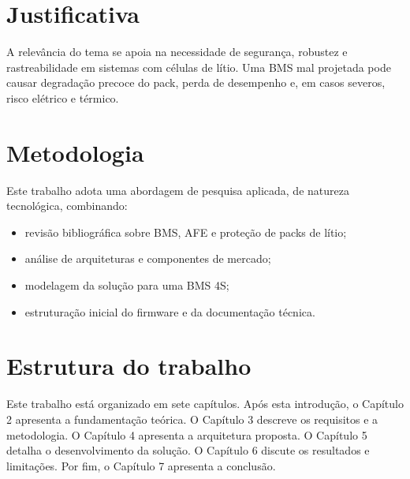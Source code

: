 \section{Justificativa}

A relevância do tema se apoia na necessidade de segurança, robustez e rastreabilidade em sistemas
com células de lítio. Uma BMS mal projetada pode causar degradação precoce do pack, perda de
desempenho e, em casos severos, risco elétrico e térmico.

\section{Metodologia}

Este trabalho adota uma abordagem de pesquisa aplicada, de natureza tecnológica, combinando:

\begin{itemize}
  \item revisão bibliográfica sobre BMS, AFE e proteção de packs de lítio;
  \item análise de arquiteturas e componentes de mercado;
  \item modelagem da solução para uma BMS 4S;
  \item estruturação inicial do firmware e da documentação técnica.
\end{itemize}

\section{Estrutura do trabalho}

Este trabalho está organizado em sete capítulos. Após esta introdução, o Capítulo 2 apresenta
a fundamentação teórica. O Capítulo 3 descreve os requisitos e a metodologia. O Capítulo 4
apresenta a arquitetura proposta. O Capítulo 5 detalha o desenvolvimento da solução. O
Capítulo 6 discute os resultados e limitações. Por fim, o Capítulo 7 apresenta a conclusão.
